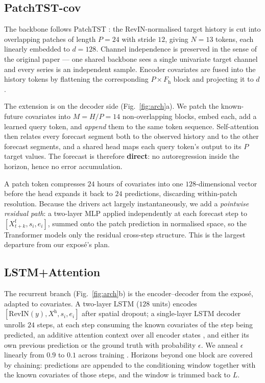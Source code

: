 \documentclass[10pt,twocolumn]{article}
\begin{document}
\subsection{PatchTST-cov}

The backbone follows PatchTST \cite{nie2023patchtst}: the RevIN-normalised target
history is cut into overlapping patches of length $P=24$ with stride $12$, giving
$N=13$ tokens, each linearly embedded to $d=128$. Channel independence is
preserved in the sense of the original paper --- one shared backbone sees a single
univariate target channel and every series is an independent sample. Encoder
covariates are fused into the history tokens by flattening the corresponding
$P\times F_{\mathrm{h}}$ block and projecting it to $d$.

The extension is on the decoder side (Fig.~\ref{fig:arch}a). We patch the
known-future covariates into $M = H/P = 14$ non-overlapping blocks, embed each,
add a learned query token, and \emph{append} them to the same token sequence.
Self-attention then relates every forecast segment both to the observed history
and to the other forecast segments, and a shared head maps each query token's
output to its $P$ target values. The forecast is therefore \textbf{direct}: no
autoregression inside the horizon, hence no error accumulation.

A patch token compresses $24$ hours of covariates into one $128$-dimensional vector
before the head expands it back to $24$ predictions, discarding within-patch
resolution. Because the drivers act largely instantaneously, we add a
\emph{pointwise residual path}: a two-layer MLP applied independently at each
forecast step to $[X^{\mathrm{f}}_{t+k}, s_i, e_i]$, summed onto the patch
prediction in normalised space, so the Transformer models only the residual
cross-step structure. This is the largest departure from our expos\'e's plan.

\subsection{LSTM+Attention}

The recurrent branch (Fig.~\ref{fig:arch}b) is the encoder--decoder from the
expos\'e, adapted to covariates. A two-layer LSTM ($128$ units) encodes
$[\text{RevIN}(y), X^{\mathrm{h}}, s_i, e_i]$ after spatial dropout; a
single-layer LSTM decoder unrolls $24$ steps, at each step consuming the known
covariates of the step being predicted, an additive attention context over all
encoder states \cite{bahdanau2015attention}, and either its own previous
prediction or the ground truth with probability $\epsilon$. We anneal $\epsilon$
linearly from $0.9$ to $0.1$ across training \cite{bengio2015scheduled}. Horizons
beyond one block are covered by chaining: predictions are appended to the
conditioning window together with the known covariates of those steps, and the
window is trimmed back to $L$.
\end{document}
